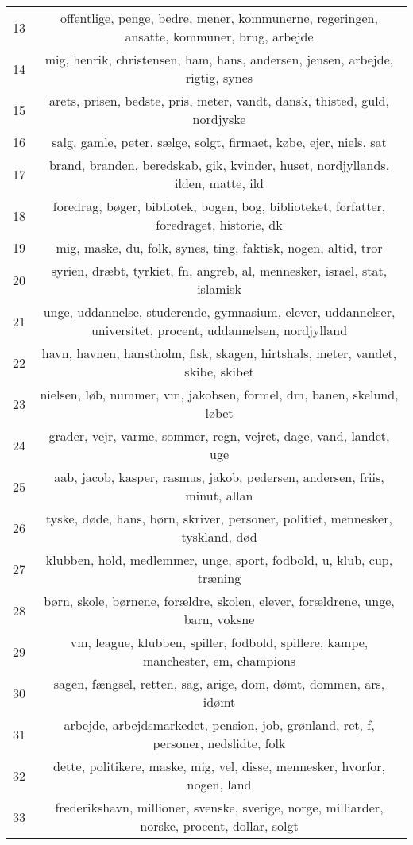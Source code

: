 \begin{longtable}[c]{c | c}
		13 & offentlige, penge, bedre, mener, kommunerne, regeringen, ansatte, kommuner, brug, arbejde \\
		14 & mig, henrik, christensen, ham, hans, andersen, jensen, arbejde, rigtig, synes \\
		15 & arets, prisen, bedste, pris, meter, vandt, dansk, thisted, guld, nordjyske \\
		16 & salg, gamle, peter, sælge, solgt, firmaet, købe, ejer, niels, sat \\
		17 & brand, branden, beredskab, gik, kvinder, huset, nordjyllands, ilden, matte, ild \\
		18 & foredrag, bøger, bibliotek, bogen, bog, biblioteket, forfatter, foredraget, historie, dk \\
		19 & mig, maske, du, folk, synes, ting, faktisk, nogen, altid, tror \\
		20 & syrien, dræbt, tyrkiet, fn, angreb, al, mennesker, israel, stat, islamisk \\
		21 & unge, uddannelse, studerende, gymnasium, elever, uddannelser, universitet, procent, uddannelsen, nordjylland \\
		22 & havn, havnen, hanstholm, fisk, skagen, hirtshals, meter, vandet, skibe, skibet \\
		23 & nielsen, løb, nummer, vm, jakobsen, formel, dm, banen, skelund, løbet \\
		24 & grader, vejr, varme, sommer, regn, vejret, dage, vand, landet, uge \\
		25 & aab, jacob, kasper, rasmus, jakob, pedersen, andersen, friis, minut, allan \\
		26 & tyske, døde, hans, børn, skriver, personer, politiet, mennesker, tyskland, død \\
		27 & klubben, hold, medlemmer, unge, sport, fodbold, u, klub, cup, træning \\
		28 & børn, skole, børnene, forældre, skolen, elever, forældrene, unge, barn, voksne \\
		29 & vm, league, klubben, spiller, fodbold, spillere, kampe, manchester, em, champions \\
		30 & sagen, fængsel, retten, sag, arige, dom, dømt, dommen, ars, idømt \\
		31 & arbejde, arbejdsmarkedet, pension, job, grønland, ret, f, personer, nedslidte, folk \\
		32 & dette, politikere, maske, mig, vel, disse, mennesker, hvorfor, nogen, land \\
		33 & frederikshavn, millioner, svenske, sverige, norge, milliarder, norske, procent, dollar, solgt \\

\end{longtable}
